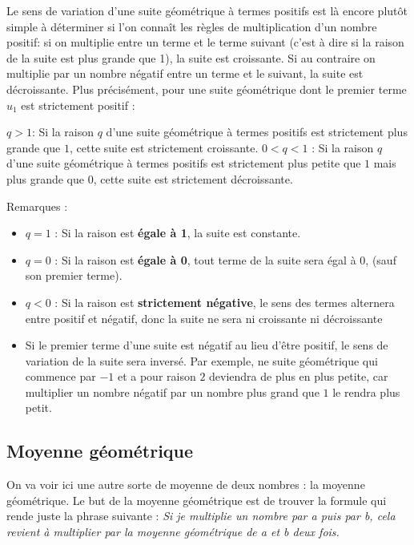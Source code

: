 \documentclass[10pt,a4paper]{book}
\begin{document}
Le sens de variation d'une suite géométrique à termes positifs est là encore plutôt simple à déterminer si l'on connaît les règles de multiplication d'un nombre positif: si on multiplie entre un terme et le terme suivant (c'est à dire si la raison de la suite est plus grande que 1), la suite est croissante. Si au contraire on multiplie par un nombre négatif entre un terme et le suivant, la suite est décroissante. Plus précisément, pour une suite géométrique dont le premier terme $u_1$ est strictement positif :

\begin{prop}
    $q>1$: Si la raison $q$ d'une suite géométrique à termes positifs est strictement plus grande que $1$, cette suite est strictement croissante.
    $0<q<1$ : Si la raison $q$ d'une suite géométrique à termes positifs  est strictement plus petite que $1$ mais plus grande que $0$, cette suite est strictement décroissante.
\end{prop}

Remarques : \begin{itemize}
    \item $q=1$ : Si la raison est \textbf{égale à 1}, la suite est constante.
    \item $q=0$ : Si la raison est \textbf{égale à 0}, tout terme de la suite sera égal à $0$, (sauf son premier terme).
    \item $q<0$ : Si la raison est \textbf{strictement négative}, le sens des termes alternera entre positif et négatif, donc la suite ne sera ni croissante ni décroissante
    \item Si le premier terme d'une suite est négatif au lieu d'être positif, le sens de variation de la suite sera inversé. Par exemple, ne suite géométrique qui commence par $-1$ et a pour raison $2$ deviendra de plus en plus petite, car multiplier un nombre négatif par un nombre plus grand que $1$ le rendra plus petit.
\end{itemize}




\subsection{Moyenne géométrique}

On va voir ici une autre sorte de moyenne de deux nombres : la moyenne géométrique. Le but de la moyenne géométrique est de trouver la formule qui rende juste la phrase suivante :   \textit{Si je multiplie un nombre par a puis par b, cela revient à multiplier par la moyenne géométrique de a et b deux fois.}
\end{document}
